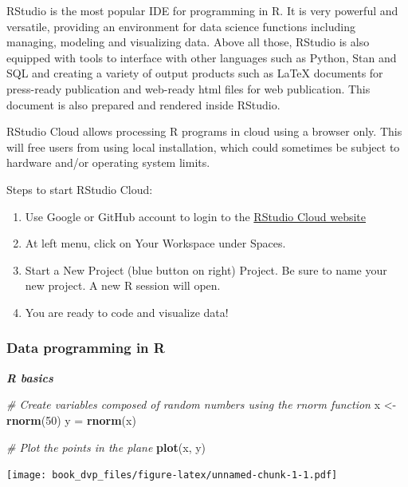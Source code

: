 \documentclass[
]{book}
\newenvironment{Shaded}{\begin{snugshade}}{\end{snugshade}}
\newcommand{\CommentTok}[1]{\textcolor[rgb]{0.56,0.35,0.01}{\textit{#1}}}
\newcommand{\DecValTok}[1]{\textcolor[rgb]{0.00,0.00,0.81}{#1}}
\newcommand{\KeywordTok}[1]{\textcolor[rgb]{0.13,0.29,0.53}{\textbf{#1}}}
\newcommand{\NormalTok}[1]{#1}
\newcommand{\StringTok}[1]{\textcolor[rgb]{0.31,0.60,0.02}{#1}}
\providecommand{\tightlist}{%
  \setlength{\itemsep}{0pt}\setlength{\parskip}{0pt}}
\begin{document}
RStudio is the most popular IDE for programming in R. It is very powerful and versatile, providing an environment for data science functions including managing, modeling and visualizing data. Above all those, RStudio is also equipped with tools to interface with other languages such as Python, Stan and SQL and creating a variety of output products such as LaTeX documents for press-ready publication and web-ready html files for web publication. This document is also prepared and rendered inside RStudio.

RStudio Cloud allows processing R programs in cloud using a browser only. This will free users from using local installation, which could sometimes be subject to hardware and/or operating system limits.

Steps to start RStudio Cloud:

\begin{enumerate}
\def\labelenumi{\arabic{enumi}.}
\tightlist
\item
  Use Google or GitHub account to login to the \href{http://Rstudio.cloud}{RStudio Cloud website}
\item
  At left menu, click on Your Workspace under Spaces.\\
\item
  Start a New Project (blue button on right) Project. Be sure to name your new project. A new R session will open.
\item
  You are ready to code and visualize data!
\end{enumerate}

\hypertarget{data-programming-in-r}{%
\subsubsection{Data programming in R}\label{data-programming-in-r}}

\textbf{\emph{R basics}}

\begin{Shaded}
\begin{Highlighting}[]
\CommentTok{# Create variables composed of random numbers using the rnorm function}
\NormalTok{x <-}\KeywordTok{rnorm}\NormalTok{(}\DecValTok{50}\NormalTok{) }
\NormalTok{y =}\StringTok{ }\KeywordTok{rnorm}\NormalTok{(x)}

\CommentTok{# Plot the points in the plane }
\KeywordTok{plot}\NormalTok{(x, y)}
\end{Highlighting}
\end{Shaded}

\texttt{[image: book\_dvp\_files/figure-latex/unnamed-chunk-1-1.pdf]}
\end{document}
